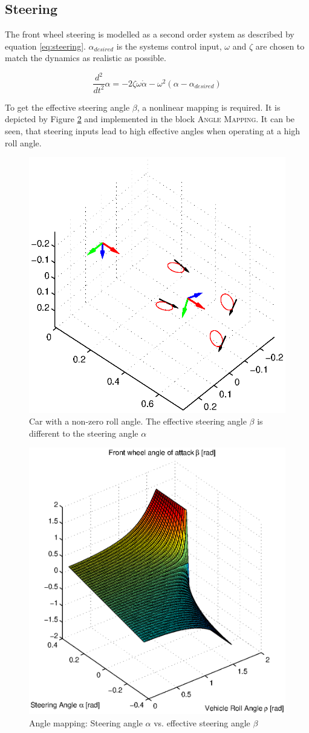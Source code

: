 \documentclass[conference]{IEEEtran}
\begin{document}
\subsection{Steering}

The front wheel steering is modelled as a second order system as described by equation \ref{eq:steering}. $\alpha _{desired}$ is the systems control input, $\omega$ and $\zeta$ are chosen to match the dynamics as realistic as possible.

\begin{equation}
\frac{{{d^2}}}{{d{t^2}}}\alpha  =  - 2\zeta \omega \dot \alpha  - {\omega ^2}\left( {\alpha  - {\alpha _{desired}}} \right)
\label{eq:steering}
\end{equation}

To get the effective steering angle $\beta$, a nonlinear mapping is required. It is depicted by Figure \ref{figure:angle_plot} and implemented in the block \textsc{Angle Mapping}. It can be seen, that steering inputs lead to high effective angles when operating at a high roll angle.

\begin{figure}[Hhh]
\centering
  \includegraphics[width=.3\textwidth]{pics/car_roll.eps} 
  \caption{Car with a non-zero roll angle. The effective steering angle $\beta$ is different to the steering angle $\alpha$}  
  \label{figure:car_roll}
\end{figure}

\begin{figure}[Hhh]
\centering
  \includegraphics[width=.4\textwidth]{pics/angle_plot.eps} 
  \caption{Angle mapping: Steering angle $\alpha$ vs. effective steering angle $\beta$}  
  \label{figure:angle_plot}
\end{figure}
\end{document}
